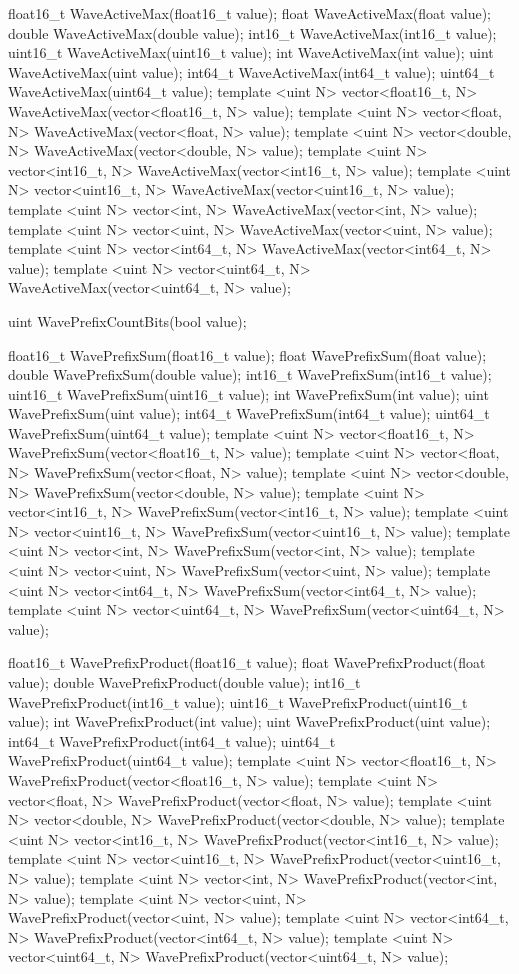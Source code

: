 \begin{HLSL}
float16_t WaveActiveMax(float16_t value);
float WaveActiveMax(float value);
double WaveActiveMax(double value);
int16_t WaveActiveMax(int16_t value);
uint16_t WaveActiveMax(uint16_t value);
int WaveActiveMax(int value);
uint WaveActiveMax(uint value);
int64_t WaveActiveMax(int64_t value);
uint64_t WaveActiveMax(uint64_t value);
template <uint N> vector<float16_t, N> WaveActiveMax(vector<float16_t, N> value);
template <uint N> vector<float, N> WaveActiveMax(vector<float, N> value);
template <uint N> vector<double, N> WaveActiveMax(vector<double, N> value);
template <uint N> vector<int16_t, N> WaveActiveMax(vector<int16_t, N> value);
template <uint N> vector<uint16_t, N> WaveActiveMax(vector<uint16_t, N> value);
template <uint N> vector<int, N> WaveActiveMax(vector<int, N> value);
template <uint N> vector<uint, N> WaveActiveMax(vector<uint, N> value);
template <uint N> vector<int64_t, N> WaveActiveMax(vector<int64_t, N> value);
template <uint N> vector<uint64_t, N> WaveActiveMax(vector<uint64_t, N> value);

uint WavePrefixCountBits(bool value);

float16_t WavePrefixSum(float16_t value);
float WavePrefixSum(float value);
double WavePrefixSum(double value);
int16_t WavePrefixSum(int16_t value);
uint16_t WavePrefixSum(uint16_t value);
int WavePrefixSum(int value);
uint WavePrefixSum(uint value);
int64_t WavePrefixSum(int64_t value);
uint64_t WavePrefixSum(uint64_t value);
template <uint N> vector<float16_t, N> WavePrefixSum(vector<float16_t, N> value);
template <uint N> vector<float, N> WavePrefixSum(vector<float, N> value);
template <uint N> vector<double, N> WavePrefixSum(vector<double, N> value);
template <uint N> vector<int16_t, N> WavePrefixSum(vector<int16_t, N> value);
template <uint N> vector<uint16_t, N> WavePrefixSum(vector<uint16_t, N> value);
template <uint N> vector<int, N> WavePrefixSum(vector<int, N> value);
template <uint N> vector<uint, N> WavePrefixSum(vector<uint, N> value);
template <uint N> vector<int64_t, N> WavePrefixSum(vector<int64_t, N> value);
template <uint N> vector<uint64_t, N> WavePrefixSum(vector<uint64_t, N> value);

float16_t WavePrefixProduct(float16_t value);
float WavePrefixProduct(float value);
double WavePrefixProduct(double value);
int16_t WavePrefixProduct(int16_t value);
uint16_t WavePrefixProduct(uint16_t value);
int WavePrefixProduct(int value);
uint WavePrefixProduct(uint value);
int64_t WavePrefixProduct(int64_t value);
uint64_t WavePrefixProduct(uint64_t value);
template <uint N> vector<float16_t, N> WavePrefixProduct(vector<float16_t, N> value);
template <uint N> vector<float, N> WavePrefixProduct(vector<float, N> value);
template <uint N> vector<double, N> WavePrefixProduct(vector<double, N> value);
template <uint N> vector<int16_t, N> WavePrefixProduct(vector<int16_t, N> value);
template <uint N> vector<uint16_t, N> WavePrefixProduct(vector<uint16_t, N> value);
template <uint N> vector<int, N> WavePrefixProduct(vector<int, N> value);
template <uint N> vector<uint, N> WavePrefixProduct(vector<uint, N> value);
template <uint N> vector<int64_t, N> WavePrefixProduct(vector<int64_t, N> value);
template <uint N> vector<uint64_t, N> WavePrefixProduct(vector<uint64_t, N> value);


\end{HLSL}
